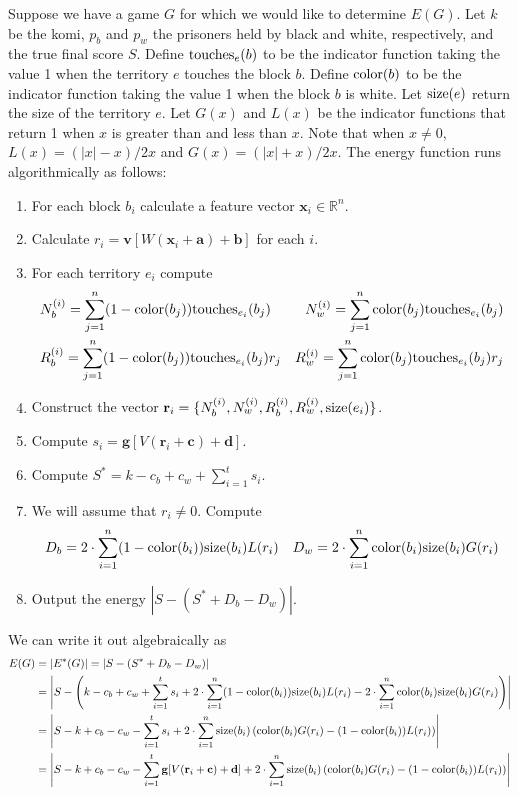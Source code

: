 \documentclass{amsart}
\def\v#1{\mathbf{#1}}
\begin{document}
Suppose we have a game $G$ for which we would like to determine $E(G)$. Let $k$ be the komi, $p_b$ and $p_w$ the prisoners
held by black and white, respectively, and the true final score $S$. Define $\mbox{touches}_{ e }{\left( b \right)}$ to be the indicator function
taking the value 1 when the territory $e$ touches the block $b$. Define $\mbox{color}{\left( b \right)}$ to be the indicator function taking the
value 1 when the block $b$ is white. Let $\mbox{size}{\left( e \right)}$ return the size of the territory $e$. Let $G(x)$ and $L(x)$ be the
indicator functions that return 1 when $x$ is greater than and less than $x$. Note that when
$x \neq 0$, $L(x) = (|x| - x) / 2 x$ and $G(x) = (|x| + x) / 2x$. The energy function runs algorithmically as follows:
\begin{enumerate}
  \item For each block $b_i$ calculate a feature vector $\v{ x }_i \in \mathbb{ R }^n$.
  \item Calculate $r_i = \v{ v }[W(\v{ x }_i + \v{ a }) + \v{ b }]$ for each $i$.
  \item For each territory $e_i$ compute
    \begin{align*}
      &N_b^{ (i) } = \sum_{ j = 1 }^n (1 - \mbox{color}{\left( b_j \right)}) \mbox{touches}_{ e_i }{\left( b_j \right)}
      &N_w^{ (i) } = \sum_{ j = 1 }^n \mbox{color}{\left( b_j \right)} \mbox{touches}_{ e_i }{\left( b_j \right)}\\
      &R_b^{ (i) } = \sum_{ j = 1 }^n (1 - \mbox{color}{\left( b_j \right)}) \mbox{touches}_{ e_i }{\left( b_j \right)} r_j
      &R_w^{ (i) } = \sum_{ j = 1 }^n \mbox{color}{\left( b_j \right)} \mbox{touches}_{ e_i }{\left( b_j \right)} r_j
    \end{align*}
  \item Construct the vector $\v{ r }_i = \{ N_b^{ (i) }, N_w^{ (i) }, R_b^{ (i) }, R_w^{ (i) }, \size{ e_i } \}$.
  \item Compute $s_i = \v{ g }[V(\v{ r }_i + \v{ c }) + \v{ d }]$.
  \item Compute $S^* = k - c_b + c_w + \sum_{ i = 1 }^t s_i$.
  \item We will assume that $r_i \neq 0$. Compute
    \begin{align*}
      &D_b = 2 \cdot \sum_{ i = 1 }^n (1 - \mbox{color}{\left( b_i \right)}) \mbox{size}{\left( b_i \right)} L(r_i)
      &D_w = 2 \cdot \sum_{ i = 1 }^n \mbox{color}{\left( b_i \right)} \mbox{size}{\left( b_i \right)} G(r_i)
    \end{align*}
  \item Output the energy $|S - (S^* + D_b - D_w)|$.
\end{enumerate}
We can write it out algebraically as
\begin{align*}
E(G) &= |E^*(G)| = |S - (S^* + D_b - D_w)|\\
  &= \left|S - \left(k - c_b + c_w + \sum_{ i = 1 }^t s_i
  + 2 \cdot \sum_{ i = 1 }^n (1 - \color{ b_i }) \size{ b_i } L(r_i)
  - 2 \cdot \sum_{ i = 1 }^n \color{ b_i } \size{ b_i } G(r_i)\right)\right|\\
  &= \left|S - k + c_b - c_w - \sum_{ i = 1 }^t s_i
  + 2 \cdot \sum_{ i = 1 }^n \size{ b_i } \left(\color{ b_i }G(r_i) - (1 - \color{ b_i }) L(r_i)\right)\right|\\
  &= \left|S - k + c_b - c_w - \sum_{ i = 1 }^t \v{ g }[V(\v{ r }_i + \v{ c }) + \v{ d }]
  + 2 \cdot \sum_{ i = 1 }^n \size{ b_i } \left(\color{ b_i }G(r_i) - (1 - \color{ b_i }) L(r_i)\right)\right|
\end{align*}
\end{document}
